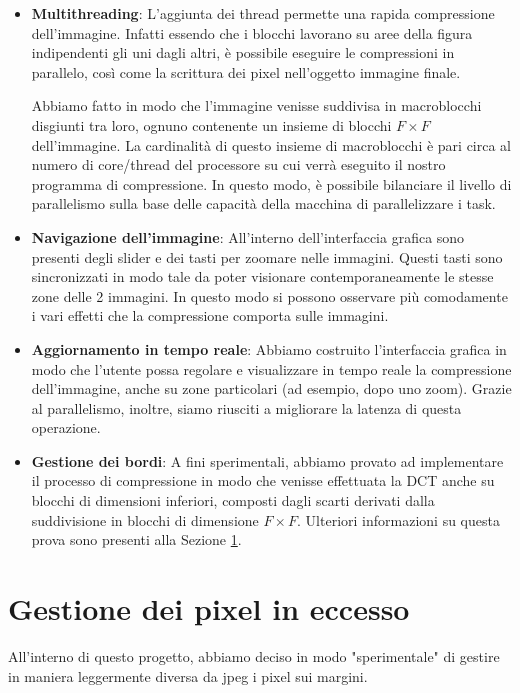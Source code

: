 \begin{itemize}
	\item \textbf{Multithreading}: L'aggiunta dei thread permette una rapida compressione dell'immagine. Infatti essendo che i blocchi lavorano su aree della figura indipendenti gli uni dagli altri, è possibile eseguire le compressioni in parallelo, così come la scrittura dei pixel nell'oggetto immagine finale.
	
	Abbiamo fatto in modo che l'immagine venisse suddivisa in macroblocchi disgiunti tra loro, ognuno contenente un insieme di blocchi $F \times F$ dell'immagine. La cardinalità di questo insieme di macroblocchi è pari circa al numero di core/thread del processore su cui verrà eseguito il nostro programma di compressione. In questo modo, è possibile bilanciare il livello di parallelismo sulla base delle capacità della macchina di parallelizzare i task.
	\item \textbf{Navigazione dell'immagine}: All'interno dell'interfaccia grafica sono presenti degli slider e dei tasti per zoomare nelle immagini. Questi tasti sono sincronizzati in modo tale da poter visionare contemporaneamente le stesse zone delle 2 immagini. In questo modo si possono osservare più comodamente i vari effetti che la compressione comporta sulle immagini.
	\item \textbf{Aggiornamento in tempo reale}: Abbiamo costruito l'interfaccia grafica in modo che l'utente possa regolare e visualizzare in tempo reale la compressione dell'immagine, anche su zone particolari (ad esempio, dopo uno zoom). Grazie al parallelismo, inoltre, siamo riusciti a migliorare la latenza di questa operazione.
	\item  \textbf{Gestione dei bordi}:  A fini sperimentali, abbiamo provato ad implementare il processo di compressione in modo che venisse effettuata la DCT anche su blocchi di dimensioni inferiori, composti dagli scarti derivati dalla suddivisione in blocchi di dimensione $ F \times F$. Ulteriori informazioni su questa prova sono presenti alla Sezione \ref{sec:border}.
	
	\end{itemize}

\section{Gestione dei pixel in eccesso}\label{sec:border}

All'interno di questo progetto, abbiamo deciso in modo "sperimentale" di gestire in maniera leggermente diversa da jpeg i pixel sui margini.

